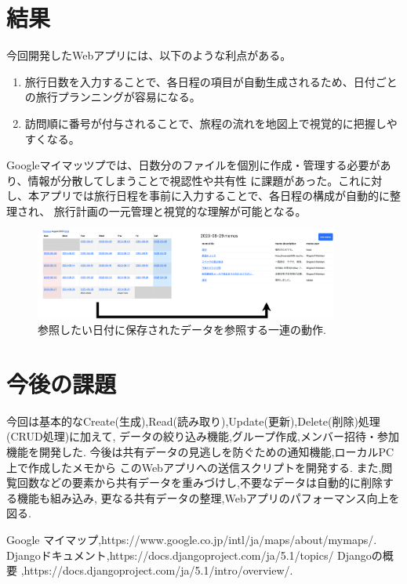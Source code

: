 \documentclass[a4j,twocolumn]{jsarticle}
\begin{document}
\section{結果}
\label{sec:orgf20fd78}
今回開発したWebアプリには、以下のような利点がある。
\begin{enumerate}
\item 旅行日数を入力することで、各日程の項目が自動生成されるため、日付ごとの旅行プランニングが容易になる。
\item 訪問順に番号が付与されることで、旅程の流れを地図上で視覚的に把握しやすくなる。
\end{enumerate}
Googleマイマッツプでは、日数分のファイルを個別に作成・管理する必要があり、情報が分散してしまうことで視認性や共有性
に課題があった。これに対し、本アプリでは旅行日程を事前に入力することで、各日程の構成が自動的に整理され、
旅行計画の一元管理と視覚的な理解が可能となる。

\begin{figure}[htbp]
\centering
\includegraphics[width=10cm]{./figs/app_motion.png}
\caption{\label{fig:org5e742ec}参照したい日付に保存されたデータを参照する一連の動作.}
\end{figure}


\section{今後の課題}
\label{sec:org25c3bc4}
今回は基本的なCreate(生成),Read(読み取り),Update(更新),Delete(削除)処理(CRUD処理)に加えて,
データの絞り込み機能,グループ作成,メンバー招待・参加機能を開発した.
今後は共有データの見逃しを防ぐための通知機能,ローカルPC上で作成したメモから
このWebアプリへの送信スクリプトを開発する.
また,閲覧回数などの要素から共有データを重みづけし,不要なデータは自動的に削除する機能も組み込み,
更なる共有データの整理,Webアプリのパフォーマンス向上を図る.


\small\setlength\baselineskip{10pt}
\begin{thebibliography}{9}

 Google マイマップ,https://www.google.co.jp/intl/ja/maps/about/mymaps/.
Djangoドキュメント,https://docs.djangoproject.com/ja/5.1/topics/
Djangoの概要 ,https://docs.djangoproject.com/ja/5.1/intro/overview/.
\end{thebibliography}
\end{document}
